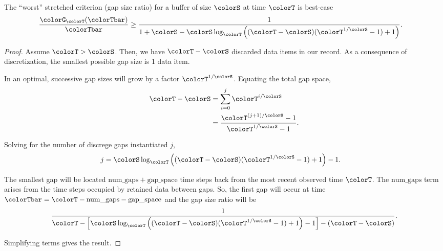 \begin{lemma}
\label{thm:stretched-ideal-strict}
The ``worst'' stretched criterion (gap size ratio) for a buffer of size $\colorS$ at time $\colorT$ is best-case
\begin{align*}
\frac{\colorG_{\colorT}(\colorTbar)}{\colorTbar}
&\geq
\frac{
  1
}{
  1 + \colorS
  - \colorS \log_{\colorT}\Big(
    (\colorT - \colorS)(\colorT^{1/\colorS} - 1) + 1
  \Big)
}.
  \end{align*}
\end{lemma}

\begin{proof}
Assume $\colorT > \colorS$.
Then, we have $\colorT - \colorS$ discarded data items in our record.
As a consequence of discretization, the smallest possible gap size is 1 data item.

In an optimal, successive gap sizes will grow by a factor $\colorT^{1/\colorS}$.
Equating the total gap space,
\begin{align*}
\colorT - \colorS
&=
\sum_{i = 0}^{j} \colorT^{i/\colorS} %
\\
&=
\frac{
  \colorT^{(j + 1)/\colorS} - 1
}{
  \colorT^{1/\colorS} - 1
}.
\end{align*}

Solving for the number of discrege gaps instantiated $j$,
\begin{align*}
j
&=
\colorS \log_{\colorT}\Big(
  (\colorT - \colorS)(\colorT^{1/\colorS} - 1) + 1
\Big) - 1.
\end{align*}

The smallest gap will be located $\mathrm{num\_gaps} + \mathrm{gap\_space}$ time steps back from the most recent observed time $\colorT$.
The $\mathrm{num\_gaps}$ term arises from the time steps occupied by retained data between gaps.
So, the first gap will occur at time $\colorTbar = \colorT - \mathrm{num\_gaps} - \mathrm{gap\_space}$ and the gap size ratio will be
\begin{align*}
\frac{1}{
\colorT
- \Big[
\colorS \log_{\colorT}\Big(
  (\colorT - \colorS)(\colorT^{1/\colorS} - 1) + 1
\Big) - 1
\Big] - (\colorT - \colorS)
}.
\end{align*}

Simplifying terms gives the result.
\end{proof}
